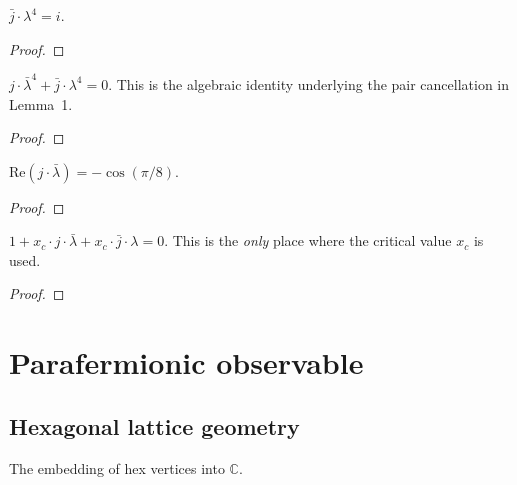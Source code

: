 \begin{lemma}[$\bar{j} \lambda^4 = i$]\label{lem:conj_j_lam_4}
\leanok
{}
  $\bar{j} \cdot \lambda^4 = i$.
\end{lemma}
\begin{proof}
\leanok
\end{proof}

\begin{theorem}\label{thm:pair_cancel}
\leanok
{}
  $j \cdot \bar{\lambda}^4 + \bar{j} \cdot \lambda^4 = 0$.
  This is the algebraic identity underlying the pair cancellation in Lemma~1.
\end{theorem}
\begin{proof}
\leanok
\end{proof}

\begin{lemma}[$\mathrm{Re}(j \bar{\lambda}) = -\cos(\pi/8)$]\label{lem:re_j_conj_lam}
\leanok
{}
  $\mathrm{Re}(j \cdot \bar{\lambda}) = -\cos(\pi/8)$.
\end{lemma}
\begin{proof}
\leanok
\end{proof}

\begin{theorem}\label{thm:triplet_cancel}
\leanok
{}
  $1 + x_c \cdot j \cdot \bar{\lambda} + x_c \cdot \bar{j} \cdot \lambda = 0$.
  This is the \emph{only} place where the critical value $x_c$ is used.
\end{theorem}
\begin{proof}
\leanok
\end{proof}


\chapter{Parafermionic observable}\label{chap:observable}

\section{Hexagonal lattice geometry}

\begin{definition}\label{def:hex_embed}
\leanok
{}
  The embedding of hex vertices into $\mathbb{C}$.
\end{definition}

